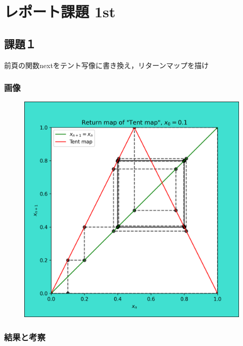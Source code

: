 \section{レポート課題 1st}

\subsection{課題１}
前頁の関数nextをテント写像に書き換え，リターンマップを描け\\
\subsubsection{画像}
\begin{figure}[htbp]
  \centering
  \includegraphics[keepaspectratio, scale=0.7]{images/Problem6/task6.png}
\end{figure}

\subsubsection{結果と考察}

